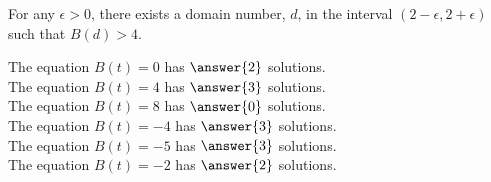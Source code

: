 \documentclass{ximera}
\begin{document}
\begin{exercise}
\begin{question}
\end{question}









\begin{question} 

For any $\epsilon > 0$, there exists a domain number, $d$, in the interval $(2-\epsilon, 2+\epsilon)$ such that $B(d) > 4$.
\begin{multipleChoice}
\end{multipleChoice}


\end{question}







\begin{question} 


The equation $B(t) = 0$ has $\answer{2}$ solutions. \\


The equation $B(t) = 4$ has $\answer{3}$ solutions. \\


The equation $B(t) = 8$ has $\answer{0}$ solutions. \\


The equation $B(t) = -4$ has $\answer{3}$ solutions. \\


The equation $B(t) = -5$ has $\answer{3}$ solutions. \\


The equation $B(t) = -2$ has $\answer{2}$ solutions. \\


\end{question}







\end{exercise}
\end{document}
